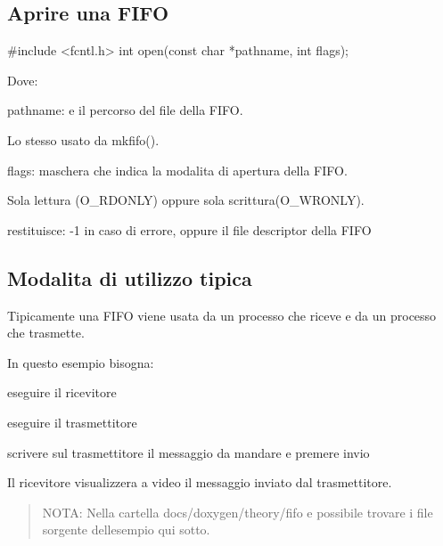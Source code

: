 \subsection*{Aprire una F\+I\+FO}


\begin{DoxyCode}
\textcolor{preprocessor}{#include <fcntl.h>}
\textcolor{keywordtype}{int} open(\textcolor{keyword}{const} \textcolor{keywordtype}{char} *pathname, \textcolor{keywordtype}{int} flags);
\end{DoxyCode}


Dove\+:
\begin{DoxyItemize}
\item pathname\+: e\textquotesingle{} il percorso del file della F\+I\+FO.

Lo stesso usato da {\ttfamily mkfifo()}.
\item flags\+: maschera che indica la modalita\textquotesingle{} di apertura della F\+I\+FO.

Sola lettura ({\ttfamily O\+\_\+\+R\+D\+O\+N\+LY}) oppure sola scrittura({\ttfamily O\+\_\+\+W\+R\+O\+N\+LY}).
\item restituisce\+: -\/1 in caso di errore, oppure il file descriptor della F\+I\+FO
\end{DoxyItemize}

\subsection*{Modalita\textquotesingle{} di utilizzo tipica}

Tipicamente una F\+I\+FO viene usata da un processo che riceve e da un processo che trasmette.

In questo esempio bisogna\+:
\begin{DoxyEnumerate}
\item eseguire il ricevitore
\item eseguire il trasmettitore
\item scrivere sul trasmettitore il messaggio da mandare e premere invio
\end{DoxyEnumerate}

Il ricevitore visualizzera\textquotesingle{} a video il messaggio inviato dal trasmettitore.

\begin{quote}
N\+O\+TA\+: Nella cartella {\ttfamily docs/doxygen/theory/fifo} e\textquotesingle{} possibile trovare i file sorgente dell\textquotesingle{}esempio qui sotto. \end{quote}



